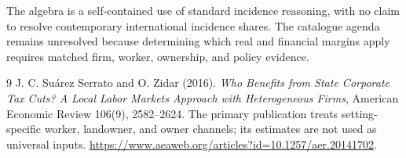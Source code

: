 \documentclass[11pt,a4paper]{article}
\begin{document}
The algebra is a self-contained use of standard incidence reasoning, with no claim to resolve contemporary international incidence shares. The catalogue agenda remains unresolved because determining which real and financial margins apply requires matched firm, worker, ownership, and policy evidence.
\begin{thebibliography}{9}
 J. C. Su\'arez Serrato and O. Zidar (2016).
\emph{Who Benefits from State Corporate Tax Cuts? A Local Labor Markets Approach with Heterogeneous Firms}, American Economic Review 106(9), 2582--2624.
The primary publication treats setting-specific worker, landowner, and owner channels; its estimates are not used as universal inputs.
\url{https://www.aeaweb.org/articles?id=10.1257/aer.20141702}.
\end{thebibliography}
\end{document}
